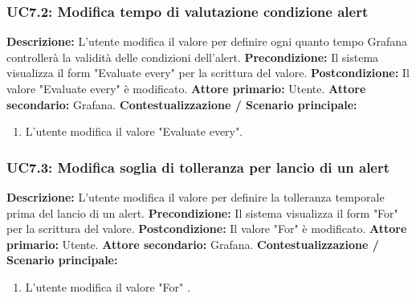                 \subsubsection{UC7.2: Modifica tempo di valutazione condizione alert}
                    \textbf{Descrizione:} L’utente modifica il valore per definire ogni quanto tempo Grafana controllerà la validità delle condizioni dell'alert.  
                    \newline
                    \textbf{Precondizione:} Il sistema visualizza il form "Evaluate every" per la scrittura del valore.
                    \newline
                    \textbf{Postcondizione:} Il valore "Evaluate every" è modificato.
                    \newline
                    \textbf{Attore primario:} Utente.
                    \newline
                    \textbf{Attore secondario:} Grafana.
                    \newline
                    \textbf{Contestualizzazione / Scenario principale:} \begin{enumerate}
                            \item L'utente modifica il valore "Evaluate every".
                        \end{enumerate}
                
                \subsubsection{UC7.3: Modifica soglia di tolleranza per lancio di un alert}
                    \textbf{Descrizione:} L’utente modifica il valore per definire la tolleranza temporale prima del lancio di un alert.  
                    \newline
                    \textbf{Precondizione:} Il sistema visualizza il form "For" per la scrittura del valore.
                    \newline
                    \textbf{Postcondizione:} Il valore "For" è modificato.
                    \newline
                    \textbf{Attore primario:} Utente.
                    \newline
                    \textbf{Attore secondario:} Grafana.
                    \newline
                    \textbf{Contestualizzazione / Scenario principale:} \begin{enumerate}
                            \item L'utente modifica il valore "For" .
                        \end{enumerate}
                
